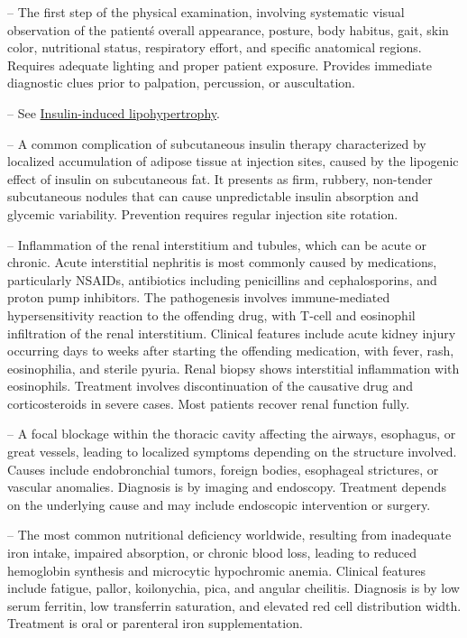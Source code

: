 -- The first step of the physical examination, involving systematic visual observation of the patient\'s overall appearance, posture, body habitus, gait, skin color, nutritional status, respiratory effort, and specific anatomical regions. Requires adequate lighting and proper patient exposure. Provides immediate diagnostic clues prior to palpation, percussion, or auscultation.

-- See \hyperlink{Insulin-induced lipohypertrophy}{Insulin-induced lipohypertrophy}.

-- A common complication of subcutaneous insulin therapy characterized by localized accumulation of adipose tissue at injection sites, caused by the lipogenic effect of insulin on subcutaneous fat. It presents as firm, rubbery, non-tender subcutaneous nodules that can cause unpredictable insulin absorption and glycemic variability. Prevention requires regular injection site rotation.

-- Inflammation of the renal interstitium and tubules, which can be acute or chronic. Acute interstitial nephritis is most commonly caused by medications, particularly NSAIDs, antibiotics including penicillins and cephalosporins, and proton pump inhibitors. The pathogenesis involves immune-mediated hypersensitivity reaction to the offending drug, with T-cell and eosinophil infiltration of the renal interstitium. Clinical features include acute kidney injury occurring days to weeks after starting the offending medication, with fever, rash, eosinophilia, and sterile pyuria. Renal biopsy shows interstitial inflammation with eosinophils. Treatment involves discontinuation of the causative drug and corticosteroids in severe cases. Most patients recover renal function fully.

-- A focal blockage within the thoracic cavity affecting the airways, esophagus, or great vessels, leading to localized symptoms depending on the structure involved. Causes include endobronchial tumors, foreign bodies, esophageal strictures, or vascular anomalies. Diagnosis is by imaging and endoscopy. Treatment depends on the underlying cause and may include endoscopic intervention or surgery.

-- The most common nutritional deficiency worldwide, resulting from inadequate iron intake, impaired absorption, or chronic blood loss, leading to reduced hemoglobin synthesis and microcytic hypochromic anemia. Clinical features include fatigue, pallor, koilonychia, pica, and angular cheilitis. Diagnosis is by low serum ferritin, low transferrin saturation, and elevated red cell distribution width. Treatment is oral or parenteral iron supplementation.

